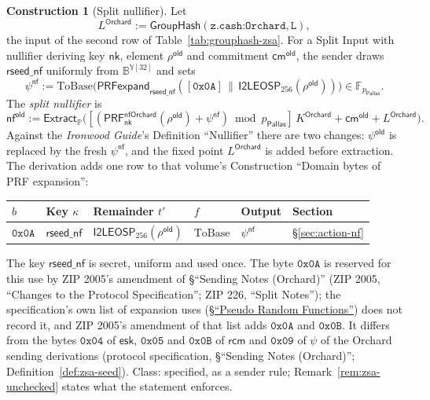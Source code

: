 \documentclass[11pt,a4paper]{article}
\theoremstyle{definition}
\newtheorem{construction}[theorem]{Construction}
\newcommand{\F}{\mathbb{F}}
\newcommand{\PP}{\mathbb{P}}
\newcommand{\nfsym}{\mathsf{nf}}
\newcommand{\cmsym}{\mathsf{cm}}
\newcommand{\Pallas}{\ensuremath{\mathsf{Pallas}}}
\newcommand{\Extract}{\ensuremath{\mathsf{Extract}}}
\newcommand{\GroupHash}{\ensuremath{\mathsf{GroupHash}}}
\newcommand{\nksym}{\ensuremath{\mathsf{nk}}}
\newcommand{\rcm}{\ensuremath{\mathsf{rcm}}}
\begin{document}
\begin{construction}[Split nullifier]\label{def:split-nf}
Let
\[
  L^{\mathsf{Orchard}} := \GroupHash(\texttt{z.cash:Orchard}, \texttt{L}),
\]
the input of the second row of Table~\ref{tab:grouphash-zsa}.
For a Split Input with nullifier deriving key $\nksym$, element
$\rho^{\mathsf{old}}$ and commitment $\cmsym^{\mathsf{old}}$, the sender
draws $\mathsf{rseed\_nf}$ uniformly from $\mathbb{B}^{\mathbb{Y}[32]}$ and
sets
\[
  \psi^{\mathsf{nf}} := \mathrm{ToBase}\bigl(
    \mathsf{PRFexpand}_{\mathsf{rseed\_nf}}([\mathtt{0x0A}] \,\|\,
    \mathsf{I2LEOSP}_{256}(\rho^{\mathsf{old}}))\bigr)
  \in \F_{p_{\Pallas}}.
\]
The \emph{split nullifier} is
\[
  \nfsym^{\mathsf{old}} := \Extract_{\PP}\bigl(
    [(\mathsf{PRF}^{\mathsf{nfOrchard}}_{\nksym}(\rho^{\mathsf{old}})
      + \psi^{\mathsf{nf}}) \bmod p_{\Pallas}]\,K^{\mathsf{Orchard}}
    + \cmsym^{\mathsf{old}} + L^{\mathsf{Orchard}}\bigr).
\]
Against the \emph{Ironwood Guide}'s Definition ``Nullifier'' there are two
changes: $\psi^{\mathsf{old}}$ is replaced by the fresh $\psi^{\mathsf{nf}}$,
and the fixed point $L^{\mathsf{Orchard}}$ is added before extraction. The
derivation adds one row to that volume's Construction ``Domain bytes of PRF
expansion'':
\begin{center}\small
\begin{tabular}{@{}llllll@{}}
\toprule
$b$ & Key $\kappa$ & Remainder $t'$ & $f$ & Output & Section \\
\midrule
$\mathtt{0x0A}$ & $\mathsf{rseed\_nf}$
  & $\mathsf{I2LEOSP}_{256}(\rho^{\mathsf{old}})$ & $\mathrm{ToBase}$
  & $\psi^{\mathsf{nf}}$ & \S\ref{sec:action-nf} \\
\bottomrule
\end{tabular}
\end{center}
The key $\mathsf{rseed\_nf}$ is secret, uniform and used once. The byte
$\mathtt{0x0A}$ is reserved for this use by ZIP 2005's amendment of
\S``Sending Notes (Orchard)'' (ZIP 2005, ``Changes to the Protocol
Specification''; ZIP 226, ``Split Notes''); the specification's own list of
expansion uses
(\href{https://zips.z.cash/protocol/protocol.pdf\#abstractprfs}{\S``Pseudo
Random Functions''}) does not record it, and ZIP 2005's amendment of that
list adds $\mathtt{0x0A}$ and $\mathtt{0x0B}$. It differs from the bytes
$\mathtt{0x04}$ of $\mathsf{esk}$, $\mathtt{0x05}$ and $\mathtt{0x0B}$ of
$\rcm$ and $\mathtt{0x09}$ of $\psi$ of the Orchard sending derivations
(protocol specification, \S``Sending Notes (Orchard)'';
Definition~\ref{def:zsa-seed}). Class: specified, as a sender rule;
Remark~\ref{rem:zsa-unchecked} states what the statement enforces.
\end{construction}
\end{document}
